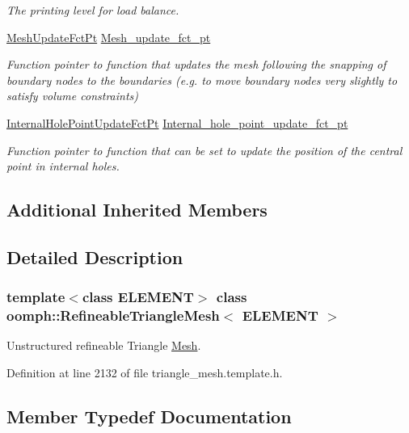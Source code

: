 \begin{DoxyCompactItemize}
\begin{DoxyCompactList}\small\item\em The printing level for load balance. \end{DoxyCompactList}\item 
\hyperlink{classoomph_1_1RefineableTriangleMesh_aa78ffa56b66a1371aec25e25f7aaff9e}{Mesh\+Update\+Fct\+Pt} \hyperlink{classoomph_1_1RefineableTriangleMesh_a4fbf41991a5b25054d43d6cd9af599a8}{Mesh\+\_\+update\+\_\+fct\+\_\+pt}
\begin{DoxyCompactList}\small\item\em Function pointer to function that updates the mesh following the snapping of boundary nodes to the boundaries (e.\+g. to move boundary nodes very slightly to satisfy volume constraints) \end{DoxyCompactList}\item 
\hyperlink{classoomph_1_1RefineableTriangleMesh_aa6831f42aa1941f4ae0b9186d01f9d7c}{Internal\+Hole\+Point\+Update\+Fct\+Pt} \hyperlink{classoomph_1_1RefineableTriangleMesh_a64228789345c2ef62942f66058c96a5e}{Internal\+\_\+hole\+\_\+point\+\_\+update\+\_\+fct\+\_\+pt}
\begin{DoxyCompactList}\small\item\em Function pointer to function that can be set to update the position of the central point in internal holes. \end{DoxyCompactList}\end{DoxyCompactItemize}
\subsection*{Additional Inherited Members}


\subsection{Detailed Description}
\subsubsection*{template$<$class E\+L\+E\+M\+E\+NT$>$\newline
class oomph\+::\+Refineable\+Triangle\+Mesh$<$ E\+L\+E\+M\+E\+N\+T $>$}

Unstructured refineable Triangle \hyperlink{classoomph_1_1Mesh}{Mesh}. 

Definition at line 2132 of file triangle\+\_\+mesh.\+template.\+h.



\subsection{Member Typedef Documentation}
\mbox{\label{classoomph_1_1RefineableTriangleMesh_aa6831f42aa1941f4ae0b9186d01f9d7c}} 
